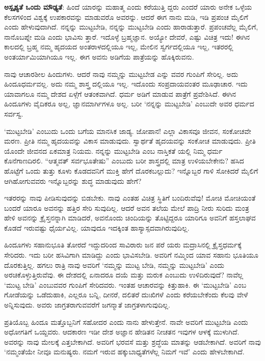 \textbf{ಅಸ್ಪೃಶ್ಯತೆ ಒಂದು ಮೌಢ್ಯತೆ}: ಹಿಂದೆ ಯಾರನ್ನು ಮಹಾತ್ಮ ಎಂದು ಕರೆಯುತ್ತಿ ದ್ದರು ಎಂದರೆ ಯಾರು ಅನೇಕ ಒಳ್ಳೆಯ ಕೆಲಸಗಳಿಂದ ವಿಶ್ವಕ್ಕೆ ಉಪಕಾರವನ್ನು ಮಾಡುವರೊ ಅವರನ್ನು. ಆದರೆ ಈಗ ನಾನು ಮಡಿ, ಇಡಿ ಪ್ರಪಂಚ ಮೈಲಿಗೆ ಎಂದು ಹೇಳುವುದಾಗಿದೆ. ನನ್ನನ್ನು ಮುಟ್ಟಬೇಡಿ, ನನ್ನನ್ನು ಮುಟ್ಟಬೇಡಿ ಎಂದು ಹಾರಾಡುತ್ತಾರೆ. ಪ್ರಪಂಚವೆಲ್ಲ ಮೈಲಿಗೆ, ನಾನೊಬಪ್ನೇ ಮಡಿ ಎಂದು ಭಾವಿಸು ತ್ತಾರೆ. ಇದೊಳ್ಳೆ ಬ್ರಹ್ಮಜ್ಞಾನ. ಅಯ್ಯೋ ದೇವರೆ, ಎಷ್ಟು ವಿಚಿತ್ರ ಇದು! ಈಗಿನ ಕಾಲದಲ್ಲಿ ಬ್ರಹ್ಮ ನಮ್ಮ ಹೃದಯದ ಅಂತರಾಳದಲ್ಲಿಯೂ ಇಲ್ಲ, ಮೇಲಿನ ಸ್ವರ್ಗದಲ್ಲಿಯೂ ಇಲ್ಲ, ಇತರರಲ್ಲಿ ಅಂತರ್ಯಾಮಿಯಾಗಿಯೂ ಇಲ್ಲ. ಈಗ ಅವನು ಅಡಿಗೆಯ ಪಾತ್ರೆಯನ್ನು ಹೊಕ್ಕಿರುವನು.

ನಾವು ಆಚಾರಶೀಲ ಹಿಂದುಗಳು. ಆದರೆ ನಾವು ನಮ್ಮನ್ನು ಮುಟ್ಟಬೇಡ ಎನ್ನು ವವರ ಗುಂಪಿಗೆ ಸೇರಿಲ್ಲ. ಅದು ಹಿಂದೂಧರ್ಮವಲ್ಲ. ಅದು ನಮ್ಮ ಶಾಸ್ತ್ರ ದಲ್ಲಿಯೂ ಇಲ್ಲ. ಇದೊಂದು ಸಂಪ್ರದಾಯವಂತರ ಮೂಢಾಚಾರ. ಇದು ಯಾವಾಗಲೂ ನಮ್ಮ ದೇಶದ ಏಳ್ಗೆಗೆ ಆತಂಕವಾಗಿದೆ. ಧರ್ಮ ಅಡಿಗೆ ಮಾಡುವ ಪಾತ್ರೆಗೆ ಪ್ರವೇಶಿಸಿದೆ. ಈಗಿನ ಹಿಂದೂಗಳು ವೈದಿಕರೂ ಅಲ್ಲ, ಜ್ಞಾನಮಾರ್ಗಿಗಳೂ ಅಲ್ಲ. ಬರೀ ‘ನನ್ನನ್ನು ಮುಟ್ಟಬೇಡಿ’ ಎಂಬುದೇ ಅವರ ಧರ್ಮದ ಸರ್ವಸ್ವ.

‘ಮುಟ್ಟಬೇಡಿ’ ಎಂಬುದು ಒಂದು ಬಗೆಯ ಮಾನಸಿಕ ಜಾಡ್ಯ. ಜೋಪಾನ! ಎಲ್ಲಾ ವಿಕಾಸವೂ ಜೀವನ, ಸಂಕೋಚವೇ ಮರಣ. ಪ್ರೀತಿ ನಮ್ಮ ಹೃದಯವನ್ನು ವಿಕಾಸ ಮಾಡುವುದು. ಸ್ವಾರ್ಥತೆ ಹೃದಯವನ್ನು ಸಂಕೋಚ ಮಾಡುವುದು. ಪ್ರೀತಿ ಯೊಂದೇ ಜೀವನದ ಏಕಮಾತ್ರ ನಿಯಮ. ನನ್ನನ್ನು ಮುಟ್ಟಬೇಡಿ ಎಂಬ ನಾಸ್ತಿಕತೆ ಯಲ್ಲಿ ನಿಮ್ಮ ಧರ್ಮ ಕೊನೆಗಾಣದಿರಲಿ. “ಆತ್ಮವತ್ ಸರ್ವಭೂತೇಷು” ಎಂಬುದು ಬರೀ ಶಾಸ್ತ್ರದಲ್ಲಿ ಮಾತ್ರ ಉಳಿಯಬೇಕೇನು? ಹಸಿದ ಹೊಟ್ಟೆಗೆ ಒಂದು ತುತ್ತು ಕೂಳು ಕೊಡದವನಿಗೆ ಮುಕ್ತಿ ಹೇಗೆ ದೊರಕಬಲ್ಲುದು? ಇನ್ನೊಬ್ಬರ ಗಾಳಿ ಸೋಕಿದರೆ ಮೈಲಿಗೆ ಆಗಿಹೋಗುವವರು ಇನ್ನೊಬ್ಬರನ್ನು ಶುದ್ಧ ಮಾಡುವುದು ಹೇಗೆ?

ಇತರರನ್ನು ನಾವು ಪೀಡಿಸುವುದನ್ನು ಬಿಡಬೇಕು. ನಾವು ಎಂತಹ ವಿಚಿತ್ರ ಸ್ಥಿತಿಗೆ ಬಂದಿರುವೆವು! ಮೋಚಿ ಮೋಚಿಯಂತೆ ಬಂದರೆ ಯಾರೂ ಅವನನ್ನು ಹತ್ತಿರ ಸೇರಿ ಸುವುದಿಲ್ಲ. ಆದರೆ ಅವನ ತಲೆಯ ಮೇಲೆ ಪಾದ್ರಿ ನೀರು ಸುರಿದು ಮಂತ್ರ ಹೇಳಿ ಅವನನ್ನು ಕ್ರೈಸ್ತನನ್ನಾಗಿ ಮಾಡಿದರೆ, ಅವನೊಂದು ಚಿಂದಿಯನ್ನು ತೊಟ್ಟಿದ್ದರೂ ಯಾರಿಗೂ ಅವನಿಗೆ ಹಸ್ತಲಾಘವ ಕೊಡದೆ ಇರುವಷ್ಟು ಧೈರ್ಯವಿಲ್ಲ. ಯಾವುದೂ ಇದಕ್ಕಿಂತ ಹಾಸ್ಯಾಸ್ಪದವಾಗಿರುವುದಿಲ್ಲ.

ಹಿಂದೂಗಳು ಸಹಾನುಭೂತಿ ತೋರದೆ ಇದ್ದುದರಿಂದ ಸಾವಿರಾರು ಜನ ಪರೆ ಯರು ಮದ್ರಾಸಿನಲ್ಲಿ ಕ್ರೈಸ್ತಧರ್ಮಕ್ಕೆ ಸೇರಿದರು. ಇದು ಬರೀ ಹಸಿವಿಗಾಗಿ ಮಾಡಿದ್ದು ಎಂದು ಭಾವಿಸಬೇಡಿ. ಅವರಿಗೆ ನಮ್ಮಿಂದ ಯಾವ ಸಹಾನು ಭೂತಿಯೂ ದೊರಕುತ್ತಿಲ್ಲ. ಹಗಲು ರಾತ್ರಿ ನಾವು ಅವರಿಗೆ ‘ನಮ್ಮನ್ನು ಮುಟ್ಟ ಬೇಡಿ, ನಮ್ಮನ್ನು ಮುಟ್ಟಬೇಡಿ’ ಎಂದು ಅರಚಿಕೊಳ್ಳುತ್ತಿರುವೆವು. ಈ ದೇಶದಲ್ಲಿ ಏನಾದರೂ ದಯೆ ಮತ್ತು ಮರುಕ ಎಂಬುದು ಉಳಿದಿರುವುದೆ? ನಾವೆಲ್ಲ ‘ಮುಟ್ಟ ಬೇಡಿ’ ಎಂಬುವವರ ಗುಂಪಿಗೆ ಸೇರಿದವರು. ಇಂತಹ ಆಚಾರವನ್ನು ಕಿತ್ತುಹಾಕಿ. ಈ ‘ಮುಟ್ಟಬೇಡಿ’ ಎಂಬ ಗೋಡೆಯನ್ನು ಒಡೆದುಹಾಕಿ, ಎಲ್ಲರೂ ಬನ್ನಿ, ದೀನರೆ, ದಲಿತರೆ ದುಃಖಿಗಳೆ ಎಂದು ಕರೆಯಬೇಕೆಂದು ಕೆಲವು ವೇಳೆ ಅನ್ನಿಸುವುದು. ಅವರು ಜಾಗ್ರತರಾಗುವವರೆಗೆ ಜಗನ್ಮಾತೆ ಜಾಗ್ರತಳಾಗುವುದಿಲ್ಲ.

ಪ್ರತಿಯೊಬ್ಬ ಹಿಂದೂ ಮತ್ತೊಬ್ಬನಿಗೆ ಸಹೋದರ ಎಂದು ನಾನು ಹೇಳುತ್ತೇನೆ. ನಾವೇ ಅವರಿಗೆ ಮುಟ್ಟಬೇಡಿ ಎಂದು ಅಧೋಗತಿಗೆ ಒಯ್ದವರು. ಆದಕಾರಣ ಇಡೀ ದೇಶ ಅಜ್ಞಾನ ಹೇಡಿತನ ನೀಚತನ ಇವುಗಳ ಆಳಕ್ಕೆ ಮುಳುಗಿದೆ. ಅವರನ್ನು ನಾವು ಮೇಲಕ್ಕೆ ಎತ್ತಬೇಕಾಗಿದೆ. ಅವರಿಗೆ ಭರವಸೆ ಮತ್ತು ಶ್ರದ್ಧೆಯ ಮಾತನ್ನು ಆಡಬೇಕಾಗಿದೆ. ಅವರಿಗೆ ನಾವು ‘ನಮ್ಮಂತೆಯೇ ನೀವೂ ಮನುಷ್ಯರು. ನಮಗೆ ಇರುವ ಹಕ್ಕುಬಾಧ್ಯತೆಗಳೆಲ್ಲ ನಿಮಗೆ ಇವೆ’ ಎಂದು ಹೇಳಬೇಕಾಗಿದೆ.

